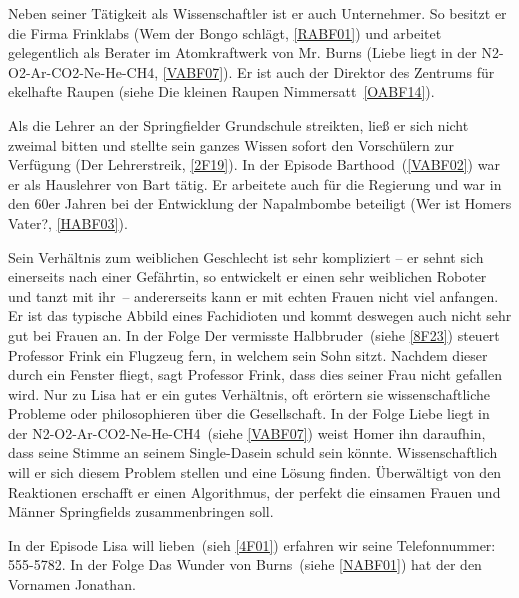 {Neben seiner Tätigkeit als Wissenschaftler ist er auch Unternehmer. So besitzt er die Firma Frink\-labs (\glqq Wem der Bongo schlägt\grqq , \ref{RABF01}) und arbeitet gelegentlich als Berater im Atomkraftwerk von Mr. Burns (\glqq Liebe liegt in der N2-O2-Ar-CO2-Ne-He-CH4\grqq , \ref{VABF07}). Er ist auch der Direktor des Zentrums für ekelhafte Raupen (siehe \glqq Die kleinen Raupen Nimmersatt\grqq\, \ref{OABF14}).

Als die Lehrer an der Springfielder Grundschule streikten, ließ er sich nicht zweimal bitten und stellte sein ganzes Wissen sofort den Vorschülern zur Verfügung (\glqq Der Lehrerstreik\grqq , \ref{2F19}). In der Episode \glqq Barthood\grqq\ (\ref{VABF02}) war er als Hauslehrer von Bart tätig. Er arbeitete auch für die Regierung und war in den 60er Jahren bei der Entwicklung der Napalmbombe beteiligt (\glqq Wer ist Homers Vater?\grqq, \ref{HABF03}).

Sein Verhältnis zum weiblichen Geschlecht ist sehr kompliziert -- er sehnt sich einerseits nach einer Gefährtin, so entwickelt er einen sehr weiblichen Roboter und tanzt mit \glqq ihr\grqq\ -- andererseits kann er mit echten Frauen nicht viel anfangen. Er ist das typische Abbild eines Fachidioten und kommt deswegen auch nicht sehr gut bei Frauen an. In der Folge \glqq Der vermisste Halbbruder\grqq\ (siehe \ref{8F23}) steuert Professor Frink ein Flugzeug fern, in welchem sein Sohn sitzt. Nachdem dieser durch ein Fenster fliegt, sagt Professor Frink, dass dies seiner Frau nicht gefallen wird. Nur zu Lisa hat er ein gutes Verhältnis, oft erörtern sie wissenschaftliche Probleme oder philosophieren über die Gesellschaft. In der Folge \glqq Liebe liegt in der N2-O2-Ar-CO2-Ne-He-CH4\grqq\ (siehe \ref{VABF07}) weist Homer ihn daraufhin, dass seine Stimme an seinem Single-Dasein schuld sein könnte. Wissenschaftlich will er sich diesem Problem stellen und eine Lösung finden. Überwältigt von den Reaktionen erschafft er einen Algorithmus, der perfekt die einsamen Frauen und Männer Springfields zusammenbringen soll.

In der Episode \glqq Lisa will lieben\grqq\ (sieh \ref{4F01}) erfahren wir seine Telefonnummer: 555-5782. In der Folge \glqq Das Wunder von Burns\grqq\ (siehe \ref{NABF01}) hat der den Vornamen Jonathan.


}
